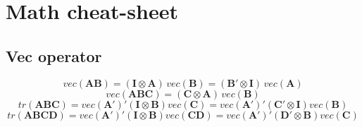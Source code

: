 \documentclass[a4paper]{article}
\newcommand{\vc}[1]{\mathbf{#1}}
\numberwithin{equation}{section}
\begin{document}
\setlength{\parindent}{0pt}
\setlength{\parskip}{1ex plus 0.5ex minus 0.2ex}

\section{Math cheat-sheet}

\subsection{Vec operator}
\begin{equation}
 vec({\vc{AB}}) = (\vc{I} \otimes \vc{A}) \, vec(\vc{B}) = (\vc{B}' \otimes \vc{I}) \, vec(\vc{A})
\end{equation}
\begin{equation}
 vec({\vc{ABC}}) = (\vc{C} \otimes \vc{A}) \, vec(\vc{B})
\end{equation}
\begin{equation}
 tr(\vc{ABC}) =  vec(\vc{A'})' (\vc{I} \otimes \vc{B}) vec(\vc{C}) =  vec(\vc{A'})' (\vc{C}' \otimes \vc{I}) vec(\vc{B})
\end{equation}
\begin{equation}
 tr(\vc{ABCD}) =  vec(\vc{A'})' (\vc{I} \otimes \vc{B}) vec(\vc{CD}) =  vec(\vc{A'})' (\vc{D}' \otimes \vc{B}) vec(\vc{C})
\end{equation}
\end{document}
